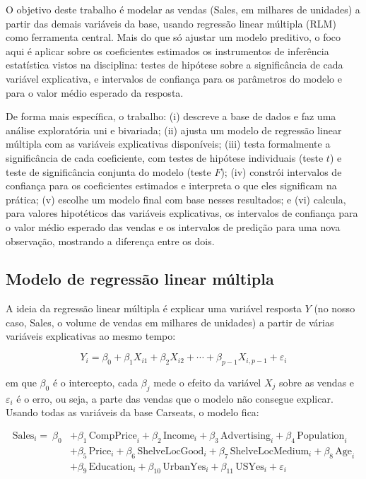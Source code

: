 \documentclass[a4paper]{modeloUFCG} %
\begin{document}
O objetivo deste trabalho é modelar as vendas (Sales, em milhares de unidades) a partir das demais variáveis da base, usando regressão linear múltipla (RLM) como ferramenta central. Mais do que só ajustar um modelo preditivo, o foco aqui é aplicar sobre os coeficientes estimados os instrumentos de inferência estatística vistos na disciplina: testes de hipótese sobre a significância de cada variável explicativa, e intervalos de confiança para os parâmetros do modelo e para o valor médio esperado da resposta.

De forma mais específica, o trabalho: (i) descreve a base de dados e faz uma análise exploratória uni e bivariada; (ii) ajusta um modelo de regressão linear múltipla com as variáveis explicativas disponíveis; (iii) testa formalmente a significância de cada coeficiente, com testes de hipótese individuais (teste \(t\)) e teste de significância conjunta do modelo (teste \(F\)); (iv) constrói intervalos de confiança para os coeficientes estimados e interpreta o que eles significam na prática; (v) escolhe um modelo final com base nesses resultados; e (vi) calcula, para valores hipotéticos das variáveis explicativas, os intervalos de confiança para o valor médio esperado das vendas e os intervalos de predição para uma nova observação, mostrando a diferença entre os dois.

\subsection{Modelo de regressão linear múltipla}\label{modelo-de-regressuxe3o-linear-muxfaltipla}

A ideia da regressão linear múltipla é explicar uma variável resposta \(Y\) (no nosso caso, Sales, o volume de vendas em milhares de unidades) a partir de várias variáveis explicativas ao mesmo tempo:

\[
Y_i = \beta_0 + \beta_1 X_{i1} + \beta_2 X_{i2} + \cdots + \beta_{p-1} X_{i,p-1} + \varepsilon_i
\]

em que \(\beta_0\) é o intercepto, cada \(\beta_j\) mede o efeito da variável \(X_j\) sobre as vendas e \(\varepsilon_i\) é o erro, ou seja, a parte das vendas que o modelo não consegue explicar. Usando todas as variáveis da base Carseats, o modelo fica:

\[
\begin{aligned}
\text{Sales}_i = \ \beta_0 &+ \beta_1\, \text{CompPrice}_i + \beta_2\, \text{Income}_i + \beta_3\, \text{Advertising}_i + \beta_4\, \text{Population}_i \\
&+ \beta_5\, \text{Price}_i + \beta_6\, \text{ShelveLocGood}_i + \beta_7\, \text{ShelveLocMedium}_i + \beta_8\, \text{Age}_i \\
&+ \beta_9\, \text{Education}_i + \beta_{10}\, \text{UrbanYes}_i + \beta_{11}\, \text{USYes}_i + \varepsilon_i
\end{aligned}
\]
\end{document}
